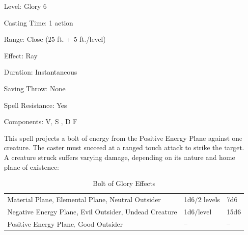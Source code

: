 
\begin{description*}
\item[Level:] Glory 6
\item[Casting Time:] 1 action
\item[Range:] Close (25 ft. + 5 ft./level)
\item[Effect:] Ray
\item[Duration:] Instantaneous
\item[Saving Throw:] None
\item[Spell Resistance:] Yes
\item[Components:] V, S , D F
\end{description*}

This spell projects a bolt of energy from the Positive Energy Plane against one
creature. The caster must succeed at a ranged touch attack to strike the target.
A creature struck suffers varying damage, depending on its nature and home plane
of existence:
\begin{table}[htb]
\caption{Bolt of Glory Effects}
\centering
\begin{tabular}{l l l}
Material Plane, Elemental Plane, Neutral Outsider & 1d6/2 levels & 7d6\\
Negative Energy Plane, Evil Outsider, Undead Creature & 1d6/level & 15d6\\
Positive Energy Plane, Good Outsider & -- & --\\
\end{tabular}
\end{table}